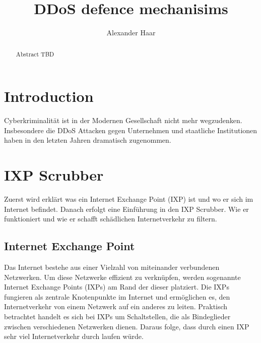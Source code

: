 \documentclass[sigplan,screen]{acmart}
\begin{document}
\title{DDoS defence mechanisims }

\author{Alexander Haar}

\begin{abstract}
  Abstract TBD
\end{abstract}



\maketitle

\section{Introduction}
Cyberkriminalität ist in der Modernen Gesellschaft nicht mehr wegzudenken. Insbesondere die DDoS Attacken gegen Unternehmen und staatliche Institutionen haben in den letzten Jahren dramatisch zugenommen.

\section{IXP Scrubber}
Zuerst wird erklärt was ein Internet Exchange Point (IXP) ist und wo er sich im Internet befindet. Danach erfolgt eine Einführung in den IXP Scrubber. Wie er funktioniert und wie er schafft schädlichen Internetverkehr zu filtern.

\subsection{Internet Exchange Point}
Das Internet bestehe aus einer Vielzahl von miteinander verbundenen Netzwerken. Um diese Netzwerke effizient zu verknüpfen, werden sogenannte Internet Exchange Points (IXPs) am Rand der dieser platziert. Die IXPs fungieren als zentrale Knotenpunkte im Internet und ermöglichen es, den Internetverkehr von einem Netzwerk auf ein anderes zu leiten. Praktisch betrachtet handelt es sich bei IXPs um Schaltstellen, die als Bindeglieder zwischen verschiedenen Netzwerken dienen. Daraus folge, dass durch einen IXP sehr viel Internetverkehr durch laufen würde.
\end{document}
